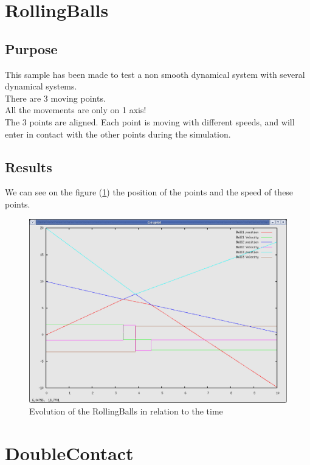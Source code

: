 \section{RollingBalls}
\subsection{Purpose}
This sample has been made to test a non smooth dynamical system with several dynamical systems.\\
There are 3 moving points.\\
All the movements are only on 1 axis!\\
The 3 points are aligned. Each point is moving with different speeds, and will enter in contact with the other points during the simulation.

\subsection{Results}
We can see on the figure (\ref{fig: RollingBalls}) the position of the points and the speed of these points.\\

	\begin{figure}
	\begin{center}
	\includegraphics[scale=0.6, clip]{figure/RollingBalls.eps}
	\caption{Evolution of the RollingBalls in relation to the time}
	\label{fig: RollingBalls}
	\end{center}
	\end{figure}

\pagebreak

\section{DoubleContact}
